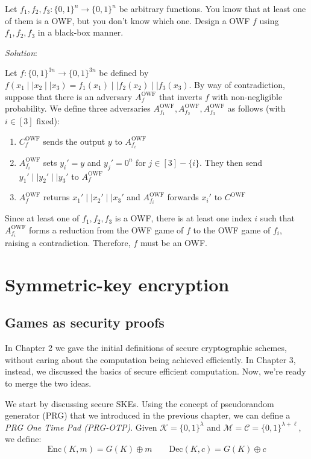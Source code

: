 \documentclass[a4paper, 12pt]{report}
\begin{document}
    \begin{framedprob}{}
        Let $f_1, f_2, f_3 : \{0,1\}^n \to \{0,1\}^n$ be arbitrary functions. You know that at least one of them is a OWF, but you don't know which one. Design a OWF $f$ using $f_1,f_2,f_3$ in a black-box manner.
    \end{framedprob}

    \textit{Solution}:

    Let $f : \{0,1\}^{3n} \to \{0,1\}^{3n}$ be defined by $f(x_1 \mid\mid x_2 \mid\mid x_3) = f_1(x_1) \mid\mid f_2(x_2) \mid\mid f_3(x_3)$. By way of contradiction, suppose that there is an adversary $A^{\text{OWF}}_f$ that inverts $f$ with non-negligible probability. We define three adversaries $A^{\text{OWF}}_{f_1}, A^{\text{OWF}}_{f_2}, A^{\text{OWF}}_{f_3}$ as follows (with $i \in [3]$ fixed):
    \begin{enumerate}
        \item $C^{\text{OWF}}_{f}$ sends the output $y$ to $A^{\text{OWF}}_{f_i}$
        \item $A^{\text{OWF}}_{f_i}$ sets $y_i' = y$ and $y_j' = 0^n$ for $j \in [3]-\{i\}$. They then send $y_1' \mid\mid y_2' \mid\mid y_3'$ to $A^{\text{OWF}}_{f}$
        \item $A^{\text{OWF}}_{f}$ returns $x_1' \mid\mid x_2' \mid\mid x_3'$ and $A^{\text{OWF}}_{f_i}$ forwards $x_i'$ to $C^{\text{OWF}}$
    \end{enumerate}

    Since at least one of $f_1, f_2, f_3$ is a OWF, there is at least one index $i$ such that $A^{\text{OWF}}_{f_i}$ forms a reduction from the OWF game of $f$ to the OWF game of $f_i$, raising a contradiction. Therefore, $f$ must be an OWF.

    \chapter{Symmetric-key encryption}

    \section{Games as security proofs}

    In Chapter 2 we gave the initial definitions of secure cryptographic schemes, without caring about the computation being achieved efficiently. In Chapter 3, instead, we discussed the basics of secure efficient computation. Now, we're ready to merge the two ideas.

    We start by discussing secure SKEs. Using the concept of pseudorandom generator (PRG) that we introduced in the previous chapter, we can define a \textit{PRG One Time Pad (PRG-OTP)}. Given $\mathcal{K} = \{0,1\}^\lambda$ and $\mathcal{M} = \mathcal{C} = \{0,1\}^{\lambda+\ell}$, we define:
    \[\mathrm{Enc}(K,m) = G(K) \oplus m \qquad \mathrm{Dec}(K,c) = G(K) \oplus c\]
\end{document}
